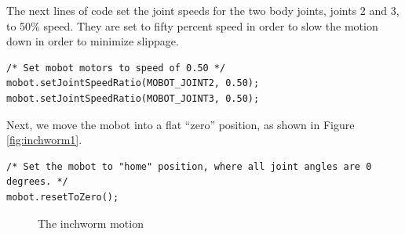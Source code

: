 \documentclass{article}
\begin{document}
The next lines of code set the joint speeds for the two body joints, joints 
2 and 3, to 50\% speed. They are set to fifty percent speed in order to 
slow the motion down in order to minimize slippage.

\begin{verbatim}
/* Set mobot motors to speed of 0.50 */
mobot.setJointSpeedRatio(MOBOT_JOINT2, 0.50);
mobot.setJointSpeedRatio(MOBOT_JOINT3, 0.50);
\end{verbatim}

Next, we move the mobot into a flat ``zero'' position, as shown in Figure \ref{fig:inchworm1}.

\begin{verbatim}
/* Set the mobot to "home" position, where all joint angles are 0 degrees. */
mobot.resetToZero();
\end{verbatim}

\begin{figure}
  \centering
  \caption{The inchworm motion}
  \label{fig:inchworm}
\end{figure}
\end{document}
